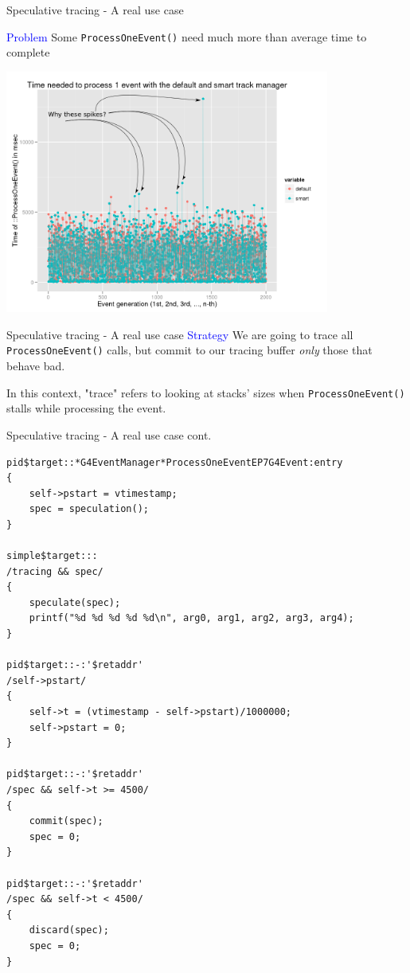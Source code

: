 \documentclass{beamer}
\begin{document}
\begin{frame}{Speculative tracing - A real use case}

\textcolor{blue}{Problem} Some {\tt ProcessOneEvent()} need much more than
average time to complete

\begin{center}
  \includegraphics[width=0.8\textwidth]{evts1-arrows.png}
\end{center}
\end{frame}

\begin{frame}{Speculative tracing - A real use case}
\textcolor{blue}{Strategy} We are going to trace all {\tt ProcessOneEvent()} calls, but commit to our tracing
buffer \textit{only} those that behave bad.

\vspace{5mm}

In this context, "trace" refers to looking at stacks' sizes when {\tt ProcessOneEvent()}
stalls while processing the event.

\end{frame}

\begin{frame}[fragile]{Speculative tracing - A real use case cont.}
\lstset{basicstyle=\tiny\ttfamily}
\lstset{frame=single, columns=flexible}
\begin{lstlisting}
pid$target::*G4EventManager*ProcessOneEventEP7G4Event:entry
{
    self->pstart = vtimestamp;
    spec = speculation();
}

simple$target:::
/tracing && spec/
{
    speculate(spec);
    printf("%d %d %d %d %d\n", arg0, arg1, arg2, arg3, arg4);
}

pid$target::-:'$retaddr'
/self->pstart/
{
    self->t = (vtimestamp - self->pstart)/1000000;
    self->pstart = 0;
}

pid$target::-:'$retaddr'
/spec && self->t >= 4500/
{
    commit(spec);
    spec = 0;
}

pid$target::-:'$retaddr'
/spec && self->t < 4500/
{
    discard(spec);
    spec = 0;
}
\end{lstlisting}
\end{frame}
\end{document}
